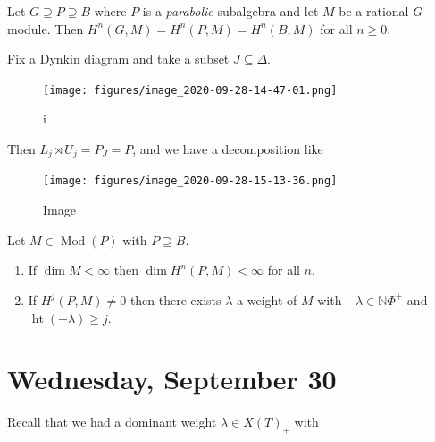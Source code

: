 \begin{corollary}[?]

Let \(G \supseteq P \supseteq B\) where \(P\) is a \emph{parabolic}
subalgebra and let \(M\) be a rational \(G{\hbox{-}}\)module. Then
\(H^n(G, M) = H^n(P, M) = H^n(B, M)\) for all \(n \geq 0\).

\end{corollary}

\begin{example}

Fix a Dynkin diagram and take a subset \(J\subseteq \Delta\).

\begin{figure}
\centering
\texttt{[image: figures/image\_2020-09-28-14-47-01.png]}
\caption{i}
\end{figure}

Then \(L_j\rtimes U_j = P_J = P\), and we have a decomposition like

\begin{figure}
\centering
\texttt{[image: figures/image\_2020-09-28-15-13-36.png]}
\caption{Image}
\end{figure}

\end{example}

\begin{proposition}[?]

Let \(M\in {\operatorname{Mod}}(P)\) with \(P\supseteq B\).

\begin{enumerate}
\def\labelenumi{\alph{enumi}.}
\item
  If \(\dim M < \infty\) then \(\dim H^n(P, M) < \infty\) for all \(n\).
\item
  If \(H^j(P, M) \neq 0\) then there exists \(\lambda\) a weight of
  \(M\) with \(-\lambda \in {\mathbb{N}}\Phi^+\) and
  \(\operatorname{ht}(-\lambda) \geq j\).
\end{enumerate}

\end{proposition}

\hypertarget{wednesday-september-30}{%
\section{Wednesday, September 30}\label{wednesday-september-30}}

Recall that we had a dominant weight \(\lambda \in X(T)_+\) with

\begin{center}
\end{center}

